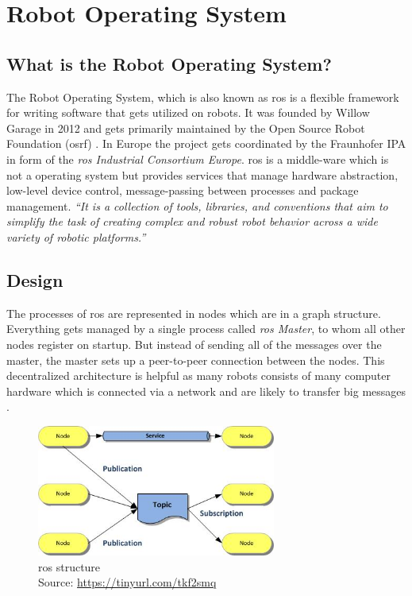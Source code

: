 
\chapter{Robot Operating System\authorA}

\section{What is the Robot Operating System?}
The Robot Operating System, which is also known as \gls{ros} is a flexible framework for writing software that gets utilized on robots. It was founded by Willow Garage in 2012 and gets primarily maintained by the Open Source Robot Foundation (\gls{osrf}) \cite{osrf}. In Europe the project gets coordinated by the Fraunhofer IPA in form of the \textit{\gls{ros} Industrial Consortium Europe}. \gls{ros} is a middle-ware which is not a operating system but provides services that manage hardware abstraction, low-level device control, message-passing between processes and package management. \emph{\enquote{It is a collection of tools, libraries, and conventions that aim to simplify the task of creating complex and robust robot behavior across a wide variety of robotic platforms.}} \cite{aboutros}

\section{Design}
The processes of \gls{ros} are represented in nodes which are in a graph structure. Everything gets managed by a single process called \textit{\gls{ros} Master}, to whom all other nodes register on startup. But instead of sending all of the messages over the master, the master sets up a peer-to-peer connection between the nodes. This decentralized architecture is helpful as many robots consists of many computer hardware which is connected via a network and are likely to transfer big messages \cite{rosoneoone}. \newline
\begin{figure}[h]
	\centering
	\includegraphics[width=0.7\textwidth]{./media/images/ros_structure.jpg}
  	\caption{\gls{ros} structure
  	\\Source: \url{https://tinyurl.com/tkf2smq}}
  	\label{rosstructure}
\end{figure}

